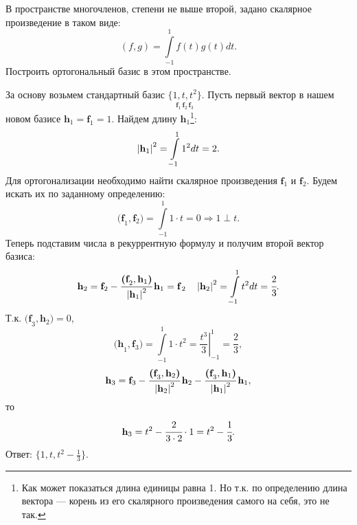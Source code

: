 \begin{prim}
	В пространстве многочленов, степени не выше второй, задано скалярное произведение в таком виде:
	$$
	(f, g) = \int\limits_{-1}^1f(t)g(t)dt.
	$$
	Построить ортогональный	базис в этом пространстве.
\end{prim}
За основу возьмем стандартный базис $\underset{\textbf{f}_1\, \textbf{f}_2\, \textbf{f}_3}{\{1, t, t^2\}}$. Пусть первый вектор в нашем новом базисе $\textbf{h}_1 = \textbf{f}_1 = 1$. Найдем длину $\textbf{h}_1$\footnote{Как может показаться длина единицы равна 1. Но т.к. по определению длина вектора --- корень из его скалярного произведения самого на себя, это не так.}:
$$
\left|\textbf{h}_1\right|^2=\int\limits_{-1}^11^2dt=2.
$$
Для ортогонализации необходимо найти скалярное произведения $\textbf{f}_1$ и $\textbf{f}_2$. Будем искать их по заданному определению:
$$
\textbf{(f}_1, \textbf{f}_2\textbf{)} = \int\limits_{-1}^1 1\cdot t=0 \Rightarrow 1\perp t.
$$
Теперь подставим числа в рекуррентную формулу и получим второй вектор базиса:
$$
\textbf{h}_2 = \textbf{f}_2 -\cfrac{\textbf{(f}_2, \textbf{h}_1\textbf{)}}{\left|\textbf{h}_1\right|^2}\,\textbf{h}_1=\textbf{\textbf{f}}_2\quad \left|\textbf{h}_2\right|^2=\int\limits_{-1}^1t^2dt=\cfrac{2}{3}.
$$
Т.к. $\textbf{(f}_3, \textbf{h}_2\textbf{)}=0$,
$$
\textbf{(h}_1, \textbf{f}_3\textbf{)} = \int\limits_{-1}^1 1\cdot t^2=\left.\frac{t^3}{3}\right|_{-1}^1 = \frac{2}{3},
$$
$$
\textbf{h}_3 = \textbf{f}_3 - \cfrac{\textbf{(f}_3, \textbf{h}_2\textbf{)}}{\left|\textbf{h}_2\right|^2}\,\textbf{h}_2-\cfrac{\textbf{(f}_3, \textbf{h}_1\textbf{)}}{\left|\textbf{h}_1\right|^2}\,\textbf{h}_1,
$$
то
$$
\textbf{h}_3 = t^2-\cfrac{2}{3\cdot2}\cdot1=t^2-\cfrac{1}{3}.
$$
Ответ: $\{1, t, t^2 - \frac{1}{3}\}$.
